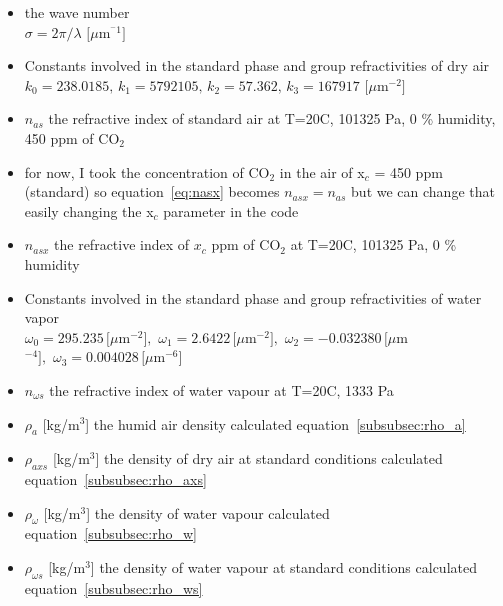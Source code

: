 \begin{itemize}
	\item the wave number\\ $\sigma  = 2\pi/\lambda\,\,[\mu $m$^{^-1}]$
	\item Constants involved in the standard phase and group refractivities of dry air \cite{Ciddor}\\ $k_0 = 238.0185,\,k_1 = 5792105,\,k_2 = 57.362,\,k_3 = 167917\,\,[\mu $m$^{-2}]$ 
	\item $n_{as}$ the refractive index of standard air at T=20\degree C, 101325 Pa, 0 \% humidity, 450 ppm of CO$_2$
	\item for now, I took the concentration of CO$_2$ in the air of x$_c$ = 450 ppm (standard) so equation~\eqref{eq:nasx} becomes $n_{asx} = n_{as}$ but we can change that easily changing the x$_c$ parameter in the code
	\item $n_{asx}$ the refractive index of $x_c$ ppm of CO$_2$ at T=20\degree C, 101325 Pa, 0 \% humidity
	\item Constants involved in the standard phase and group refractivities of water vapor\cite{Ciddor}\\ $\omega_0 = 295.235\,[\mu $m$^{-2}],\,\,\omega_1 = 2.6422\,[\mu $m$^{-2}],\,\,\omega_2 = -0.032380\,[\mu $m$^{-4}],\,\,\omega_3 = 0.004028\,[\mu$m$^{-6}]$
	\item $n_{\omega s}$ the refractive index of water vapour at T=20\degree C, 1333 Pa
	\item $\rho_a$ [kg/m$^3$] the humid air density calculated equation~\eqref{subsubsec:rho_a}
	\item $\rho_{axs}$ [kg/m$^3$] the density of dry air at standard conditions calculated equation~\eqref{subsubsec:rho_axs}
	\item $\rho_\omega$ [kg/m$^3$] the density of water vapour calculated equation~\eqref{subsubsec:rho_w}
	\item $\rho_{\omega s}$ [kg/m$^3$] the density of water vapour at standard conditions calculated equation~\eqref{subsubsec:rho_ws}
\end{itemize}

